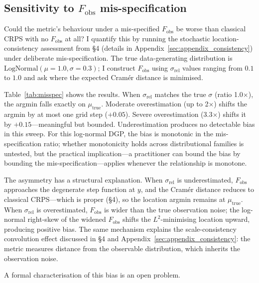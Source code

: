 \subsection{Sensitivity to $F_\text{obs}$ mis-specification}

Could the metric's behaviour under a mis-specified $F_\text{obs}$ be worse than classical CRPS with no $F_\text{obs}$ at all? I quantify this by running the stochastic location-consistency assessment from \S4 (details in Appendix~\ref{sec:appendix_consistency}) under deliberate mis-specification. The true data-generating distribution is $\text{LogNormal}(\mu = 1.0, \sigma = 0.3)$; I construct $F_\text{obs}$ using $\sigma_\text{rel}$ values ranging from $0.1$ to $1.0$ and ask where the expected Cram\'er distance is minimised.

Table~\ref{tab:misspec} shows the results. When $\sigma_\text{rel}$ matches the true $\sigma$ (ratio 1.0$\times$), the argmin falls exactly on $\mu_\text{true}$. Moderate overestimation (up to 2$\times$) shifts the argmin by at most one grid step ($+0.05$). Severe overestimation (3.3$\times$) shifts it by $+0.15$---meaningful but bounded. Underestimation produces no detectable bias in this sweep. For this log-normal DGP, the bias is monotonic in the mis-specification ratio; whether monotonicity holds across distributional families is untested, but the practical implication---a practitioner can bound the bias by bounding the mis-specification---applies whenever the relationship is monotone.

The asymmetry has a structural explanation. When $\sigma_\text{rel}$ is underestimated, $F_\text{obs}$ approaches the degenerate step function at $y$, and the Cram\'er distance reduces to classical CRPS---which is proper (\S4), so the location argmin remains at $\mu_\text{true}$. When $\sigma_\text{rel}$ is overestimated, $F_\text{obs}$ is wider than the true observation noise; the log-normal right-skew of the widened $F_\text{obs}$ shifts the $L^2$-minimising location upward, producing positive bias. The same mechanism explains the scale-consistency convolution effect discussed in \S4 and Appendix~\ref{sec:appendix_consistency}: the metric measures distance from the observable distribution, which inherits the observation noise.

A formal characterisation of this bias is an open problem.

